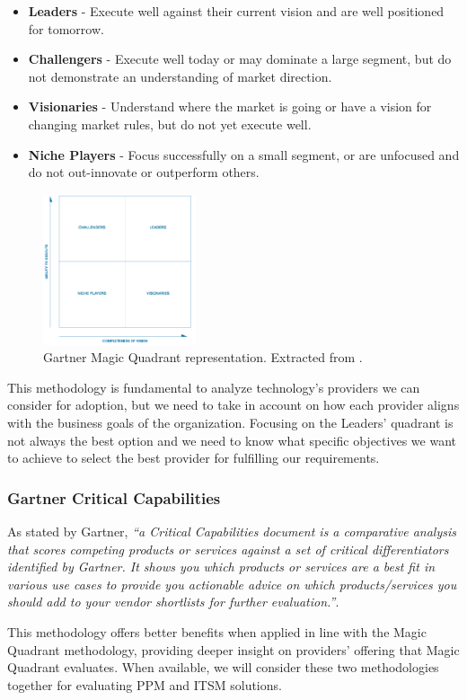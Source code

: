 \begin{itemize}
\item \textbf{Leaders} - Execute well against their current vision and are well positioned for tomorrow.
\item \textbf{Challengers} - Execute well today or may dominate a large segment, but do not demonstrate an understanding of market direction.
\item \textbf{Visionaries} - Understand where the market is going or have a vision for changing market rules, but do not yet execute well.
\item \textbf{Niche Players} - Focus successfully on a small segment, or are unfocused and do not out-innovate or outperform others.
\end{itemize}

\begin{figure}[h!]
\centering
\includegraphics[width=0.4\textwidth]{img/GartnerMagicQuadrant.png}
\caption{Gartner Magic Quadrant representation. Extracted from \cite{GartnerMagicQuadrant}.}
\end{figure}

This methodology is fundamental to analyze technology's providers we can consider for adoption, but we need to take in account on how each provider aligns with the business goals of the organization. Focusing on the Leaders' quadrant is not always the best option and we need to know what specific objectives we want to achieve to select the best provider for fulfilling our requirements. 


\subsubsection{Gartner Critical Capabilities}

As stated by Gartner\cite{GartnerCriticalCapabilities}, \textit{``a Critical Capabilities document is a comparative analysis that scores competing products or services against a set of critical differentiators identified by Gartner. It shows you which products or services are a best fit in various use cases to provide you actionable advice on which products/services you should add to your vendor shortlists for further evaluation.''}.\par
This methodology offers better benefits when applied in line with the Magic Quadrant methodology, providing deeper insight on providers' offering that Magic Quadrant evaluates. When available, we will consider these two methodologies together for evaluating PPM and ITSM solutions.\par


